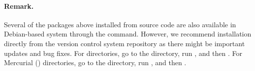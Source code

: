 \documentclass[%
oneside,                 %
final,                   %
chapterprefix=true,      %
open=right               %
10pt]{book}
\begin{document}
\paragraph{Remark.}
Several of the packages above installed from source code
are also available in Debian-based system through the
 command. However, we recommend installation directly
from the version control system repository as there might be important
updates and bug fixes. For  directories, go to the directory,
run , and then . For
Mercurial () directories, go to the directory, run
, and then .

\printindex
\end{document}
